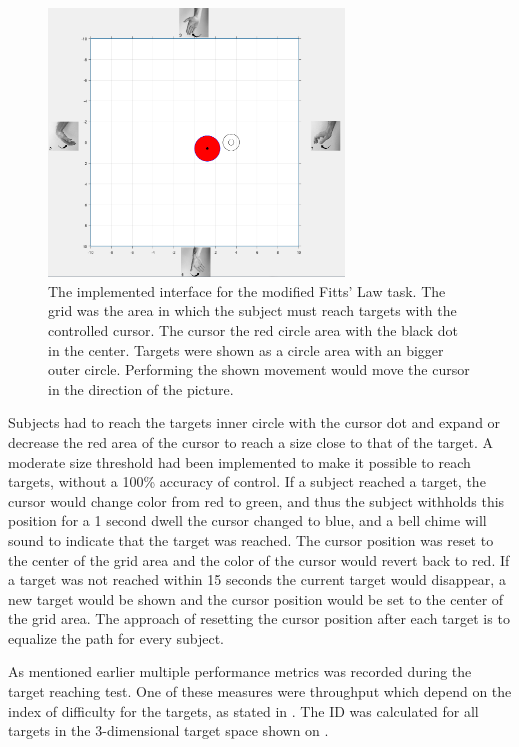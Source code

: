 \begin{figure}[H] 
	\includegraphics[width=0.7\textwidth]{figures/xBackground/perftestGUI}
	\caption{The implemented interface for the modified Fitts' Law task. The grid was the area in which the subject must reach targets with the controlled cursor. The cursor  the red circle area with the black dot in the center. Targets were shown as a circle area with an bigger outer circle. Performing the shown movement would move the cursor in the direction of the picture.}
	\label{fig:fittsLawTask}
\end{figure}

Subjects had to reach the targets inner circle with the cursor dot and expand or decrease the red area of the cursor to reach a size close to that of the target. A moderate size threshold had been implemented to make it possible to reach targets, without a 100\% accuracy of control. If a subject reached a target, the cursor would change color from red to green, and thus the subject withholds this position for a 1 second dwell the cursor changed to blue, and a bell chime will sound to indicate that the target was reached. The cursor position was reset to the center of the grid area and the color of the cursor would revert back to red. If a target was not reached within 15 seconds the current target would disappear, a new target would be shown and the cursor position would be set to the center of the grid area. The approach of resetting the cursor position after each target is to equalize the path for every subject. 

As mentioned earlier multiple performance metrics was recorded during the target reaching test. One of these measures were throughput which depend on the index of difficulty for the targets, as stated in . The ID was calculated for all targets in the 3-dimensional target space shown on . 

